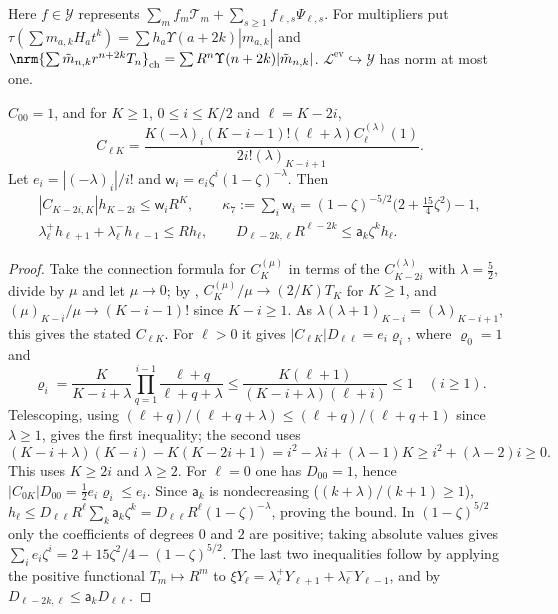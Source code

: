 Here $f\in\mathcal Y$ represents $\sum_m f_m\mathcal T_m+\sum_{s\geq1}f_{\ell,s}\Psi_{\ell,s}$. For multipliers put $\tau(\sum m_{a,k}H_at^k)=\sum h_a\Upsilon(a+2k)|m_{a,k}|$ and $\nrm{\sum\tilde m_{n,k}r^{n+2k}T_n}_{\mathrm{ch}}=\sum R^n\Upsilon(n+2k)|\tilde m_{n,k}|$. $\mathcal L^{\mathrm{ev}}\hookrightarrow\mathcal Y$ has norm at most one.

\begin{lemma}\label{r7:lem-conn}
$C_{00}=1$, and for $K\geq1$, $0\leq i\leq K/2$ and $\ell=K-2i$,
\[
C_{\ell K}=\frac{K(-\lambda)_i(K-i-1)!(\ell+\lambda)C^{(\lambda)}_\ell(1)}{2i!(\lambda)_{K-i+1}}.
\]
Let $e_i=|(-\lambda)_i|/i!$ and $\mathsf w_i=e_i\zeta^i(1-\zeta)^{-\lambda}$. Then
\begin{gather*}
|C_{K-2i,K}|h_{K-2i}\leq\mathsf w_iR^K,\qquad
\kappa_7:=\sum_i\mathsf w_i=(1-\zeta)^{-5/2}\Big(2+\frac{15}4\zeta^2\Big)-1,\\
\lambda^+_\ell h_{\ell+1}+\lambda^-_\ell h_{\ell-1}\leq Rh_\ell,\qquad
D_{\ell-2k,\ell}R^{\ell-2k}\leq\mathsf a_k\zeta^kh_\ell.
\end{gather*}
\end{lemma}
\begin{proof}
Take the connection formula \cite[18.18.16]{DLMF} for $C^{(\mu)}_K$ in terms of the $C^{(\lambda)}_{K-2i}$ with $\lambda=\frac52$, divide by $\mu$ and let $\mu\to0$; by \cite[18.7.25]{DLMF}, $C^{(\mu)}_K/\mu\to(2/K)T_K$ for $K\geq1$, and $(\mu)_{K-i}/\mu\to(K-i-1)!$ since $K-i\geq1$. As $\lambda(\lambda+1)_{K-i}=(\lambda)_{K-i+1}$, this gives the stated $C_{\ell K}$. For $\ell>0$ it gives $|C_{\ell K}|D_{\ell\ell}=e_i\varrho_i$, where $\varrho_0=1$ and
\[
\varrho_i=\frac K{K-i+\lambda}\prod_{q=1}^{i-1}\frac{\ell+q}{\ell+q+\lambda}
\leq\frac{K(\ell+1)}{(K-i+\lambda)(\ell+i)}\leq1\quad(i\geq1).
\]
Telescoping, using $(\ell+q)/(\ell+q+\lambda)\leq(\ell+q)/(\ell+q+1)$ since $\lambda\geq1$, gives the first inequality; the second uses
\[
(K-i+\lambda)(K-i)-K(K-2i+1)
=i^2-\lambda i+(\lambda-1)K\geq i^2+(\lambda-2)i\geq0.
\]
This uses $K\geq2i$ and $\lambda\geq2$. For $\ell=0$ one has $D_{00}=1$, hence $|C_{0K}|D_{00}=\frac12e_i\varrho_i\leq e_i$. Since $\mathsf a_k$ is nondecreasing ($(k+\lambda)/(k+1)\geq1$),
$h_\ell\leq D_{\ell\ell}R^\ell\sum_k\mathsf a_k\zeta^k=D_{\ell\ell}R^\ell(1-\zeta)^{-\lambda}$, proving the bound. In $(1-\zeta)^{5/2}$ only the coefficients of degrees $0$ and $2$ are positive; taking absolute values gives $\sum_ie_i\zeta^i=2+15\zeta^2/4-(1-\zeta)^{5/2}$. The last two inequalities follow by applying the positive functional $T_m\mapsto R^m$ to $\xi Y_\ell=\lambda^+_\ell Y_{\ell+1}+\lambda^-_\ell Y_{\ell-1}$, and by $D_{\ell-2k,\ell}\leq\mathsf a_kD_{\ell\ell}$.
\end{proof}

